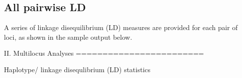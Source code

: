 \documentclass[letterpaper,10pt,english,openany,oneside]{sphinxmanual}
\begin{document}
\subsection{All pairwise LD}
\label{\detokenize{docs/guide-chapter-instructions:all-pairwise-ld}}\label{\detokenize{docs/guide-chapter-instructions:instructions-pairwise-ld}}
\sphinxAtStartPar
A series of linkage disequilibrium (LD) measures are provided for each
pair of loci, as shown in the sample output below.

\begin{sphinxVerbatim}[commandchars=\\\{\}]
II. Multi\PYGZhy{}locus Analyses
========================

Haplotype/ linkage disequlibrium (LD) statistics
\PYGZus{}\PYGZus{}\PYGZus{}\PYGZus{}\PYGZus{}\PYGZus{}\PYGZus{}\PYGZus{}\PYGZus{}\PYGZus{}\PYGZus{}\PYGZus{}\PYGZus{}\PYGZus{}\PYGZus{}\PYGZus{}\PYGZus{}\PYGZus{}\PYGZus{}\PYGZus{}\PYGZus{}\PYGZus{}\PYGZus{}\PYGZus{}\PYGZus{}\PYGZus{}\PYGZus{}\PYGZus{}\PYGZus{}\PYGZus{}\PYGZus{}\PYGZus{}\PYGZus{}\PYGZus{}\PYGZus{}\PYGZus{}\PYGZus{}\PYGZus{}\PYGZus{}\PYGZus{}\PYGZus{}\PYGZus{}\PYGZus{}\PYGZus{}\PYGZus{}\PYGZus{}\PYGZus{}\PYGZus{}


\end{sphinxVerbatim}
\end{document}
